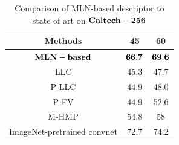 \documentclass[journal]{IEEEtran}
\begin{document}
\begin{table}[!t]
\caption{Comparison of MLN-based descriptor to state of art on $\bf{Caltech-256}$}
\begin{center}
\begin{tabular}{|c|c|c|}
\hline
Methods & 45 & 60 \\
\hline
$\bf{MLN-based}$ & $\bf{66.7}$ & $\bf{69.6}$ \\
\hline
LLC &  45.3 & 47.7\\
\hline
P-LLC & 44.9 & 48.0\\
\hline
P-FV & 44.9 & 52.6\\
\hline
M-HMP & 54.8 & 58 \\
\hline
ImageNet-pretrained convnet & 72.7 & 74.2 \\
\hline
\end{tabular}
\end{center}
\end{table}
\end{document}

